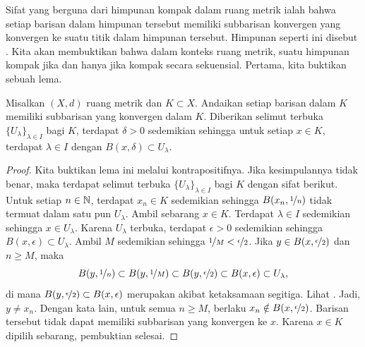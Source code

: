 Sifat yang berguna dari himpunan kompak dalam ruang metrik ialah bahwa setiap
barisan dalam himpunan tersebut memiliki subbarisan konvergen yang konvergen
ke suatu titik dalam himpunan tersebut.
Himpunan seperti ini disebut
\emph{}.
Kita akan membuktikan bahwa dalam
konteks ruang metrik, suatu himpunan kompak jika dan hanya jika kompak secara
sekuensial.
Pertama, kita buktikan sebuah lema.

\begin{lemma}\label{ms:lebesgue}
Misalkan $(X,d)$ ruang metrik dan $K \subset X$.  Andaikan 
setiap barisan dalam $K$ memiliki subbarisan yang konvergen dalam $K$.  Diberikan
selimut terbuka $\{ U_\lambda \}_{\lambda \in I}$ bagi $K$, terdapat
$\delta > 0$ sedemikian sehingga untuk setiap $x \in K$, terdapat $\lambda \in I$
dengan $B(x,\delta) \subset U_\lambda$.
\end{lemma}

\begin{proof}
Kita buktikan lema ini melalui kontrapositifnya.
Jika kesimpulannya tidak benar, maka
terdapat
selimut terbuka $\{ U_\lambda \}_{\lambda \in I}$ bagi $K$ dengan
sifat berikut.
Untuk setiap $n \in {\mathbb{N}}$, terdapat $x_n \in K$ sedemikian sehingga
$B(x_n,\nicefrac{1}{n})$ tidak termuat dalam satu pun $U_\lambda$.
Ambil sebarang $x \in K$.  Terdapat
$\lambda \in I$ sedemikian sehingga $x \in U_\lambda$.  Karena $U_\lambda$ terbuka,
terdapat $\epsilon > 0$ 
sedemikian sehingga $B(x,\epsilon) \subset U_\lambda$.  Ambil $M$ sedemikian sehingga
$\nicefrac{1}{M} < \nicefrac{\epsilon}{2}$.  Jika $y \in 
B(x,\nicefrac{\epsilon}{2})$ dan $n \geq M$, maka 
\begin{equation*}
B(y,\nicefrac{1}{n}) \subset
B(y,\nicefrac{1}{M}) \subset
B(y,\nicefrac{\epsilon}{2}) \subset B(x,\epsilon)
\subset U_\lambda ,
\end{equation*}
di mana 
$B(y,\nicefrac{\epsilon}{2}) \subset B(x,\epsilon)$
merupakan akibat ketaksamaan segitiga.
Lihat .
Jadi, $y \neq x_n$.
Dengan kata lain, untuk semua $n \geq M$, berlaku $x_n \notin B(x,\nicefrac{\epsilon}{2})$. 
Barisan tersebut tidak dapat memiliki subbarisan yang konvergen ke $x$.  Karena $x \in K$
dipilih sebarang, pembuktian selesai.
\end{proof}

